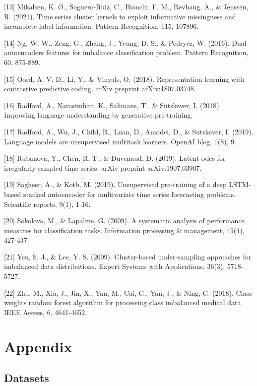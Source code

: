\documentclass{article}
\begin{document}
{[13] Mikalsen, K. Ø., Soguero-Ruiz, C., Bianchi, F. M., Revhaug, A., \& Jenssen, R. (2021). Time series cluster kernels to exploit informative missingness and incomplete label information. Pattern Recognition, 115, 107896.

[14] Ng, W. W., Zeng, G., Zhang, J., Yeung, D. S., \& Pedrycz, W. (2016). Dual autoencoders features for imbalance classification problem. Pattern Recognition, 60, 875-889.

[15] Oord, A. V. D., Li, Y., \& Vinyals, O. (2018). Representation learning with contrastive predictive coding. arXiv preprint arXiv:1807.03748.

[16] Radford, A., Narasimhan, K., Salimans, T., \& Sutskever, I. (2018). Improving language understanding by generative pre-training.

[17] Radford, A., Wu, J., Child, R., Luan, D., Amodei, D., \& Sutskever, I. (2019). Language models are unsupervised multitask learners. OpenAI blog, 1(8), 9.

[18] Rubanova, Y., Chen, R. T., \& Duvenaud, D. (2019). Latent odes for irregularly-sampled time series. arXiv preprint arXiv:1907.03907.

[19] Sagheer, A., \& Kotb, M. (2019). Unsupervised pre-training of a deep LSTM-based stacked autoencoder for multivariate time series forecasting problems. Scientific reports, 9(1), 1-16.

[20] Sokolova, M., \& Lapalme, G. (2009). A systematic analysis of performance measures for classification tasks. Information processing \& management, 45(4), 427-437.

[21] Yen, S. J., \& Lee, Y. S. (2009). Cluster-based under-sampling approaches for imbalanced data distributions. Expert Systems with Applications, 36(3), 5718-5727.

[22] Zhu, M., Xia, J., Jin, X., Yan, M., Cai, G., Yan, J., \& Ning, G. (2018). Class weights random forest algorithm for processing class imbalanced medical data. IEEE Access, 6, 4641-4652.

}







\newpage
\appendix

\section{Appendix}
\subsection{\large Datasets}
\end{document}
